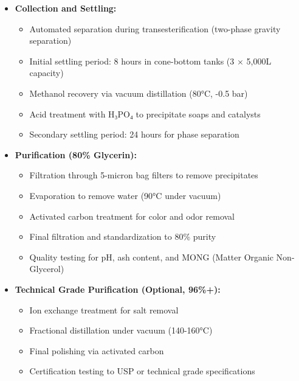 \begin{itemize}
    \item \textbf{Collection and Settling:}
    \begin{itemize}
        \item Automated separation during transesterification (two-phase gravity separation)
        \item Initial settling period: 8 hours in cone-bottom tanks (3 × 5,000L capacity)
        \item Methanol recovery via vacuum distillation (80°C, -0.5 bar)
        \item Acid treatment with H₃PO₄ to precipitate soaps and catalysts
        \item Secondary settling period: 24 hours for phase separation
    \end{itemize}
    
    \item \textbf{Purification (80\% Glycerin):}
    \begin{itemize}
        \item Filtration through 5-micron bag filters to remove precipitates
        \item Evaporation to remove water (90°C under vacuum)
        \item Activated carbon treatment for color and odor removal
        \item Final filtration and standardization to 80\% purity
        \item Quality testing for pH, ash content, and MONG (Matter Organic Non-Glycerol)
    \end{itemize}
    
    \item \textbf{Technical Grade Purification (Optional, 96\%+):}
    \begin{itemize}
        \item Ion exchange treatment for salt removal
        \item Fractional distillation under vacuum (140-160°C)
        \item Final polishing via activated carbon
        \item Certification testing to USP or technical grade specifications
    \end{itemize}
\end{itemize}

